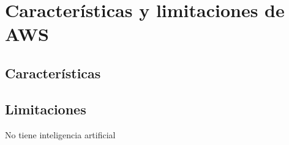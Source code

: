 \chapter{Características y limitaciones de AWS}
\section{Características}


\section{Limitaciones}
No tiene inteligencia artificial